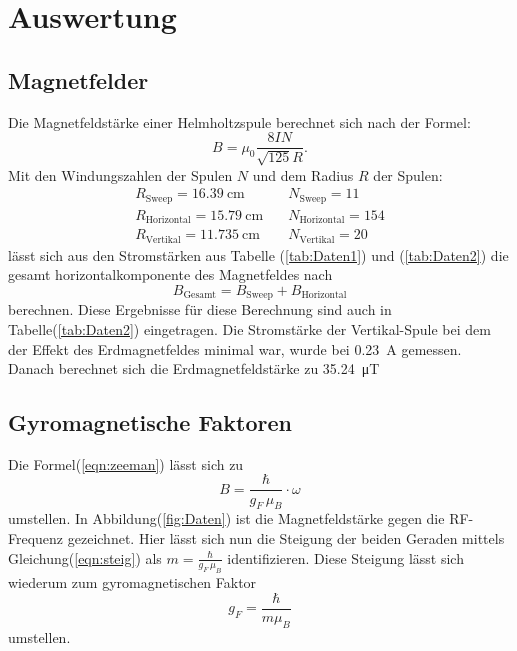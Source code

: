\section{Auswertung}
	

	\subsection{Magnetfelder}
		
		\noindent
		Die Magnetfeldstärke einer Helmholtzspule berechnet sich nach der Formel:
		\begin{equation}
			B = \mu_0 \frac{8IN}{\sqrt{125}R}.
		\end{equation}		
		Mit den Windungszahlen der Spulen $N$ und dem Radius $R$ der Spulen:
		\begin{align*}
			R_\text{Sweep} = \SI{16.39}{\centi\metre}			\quad   &N_\text{Sweep}    = 11		\\
			R_\text{Horizontal} = \SI{15.79}{\centi\metre}		\quad 	&N_\text{Horizontal} = 154  \\
			R_\text{Vertikal} = \SI{11.735}{\centi\metre}		\quad	&N_\text{Vertikal} = 20
		\end{align*}
		lässt sich aus den Stromstärken aus Tabelle (\ref{tab:Daten1}) und (\ref{tab:Daten2}) die gesamt horizontalkomponente des Magnetfeldes nach
		\begin{equation*}
			B_\text{Gesamt} = B_\text{Sweep} + B_\text{Horizontal}
		\end{equation*} 
		berechnen. Diese Ergebnisse für diese Berechnung sind auch in Tabelle(\ref{tab:Daten2}) eingetragen.
		Die Stromstärke der Vertikal-Spule bei dem der Effekt des Erdmagnetfeldes minimal war, wurde bei \SI{0.23}{\ampere}  gemessen.
		Danach berechnet sich die Erdmagnetfeldstärke zu \SI{35.24}{\micro\tesla}
		
	\subsection{Gyromagnetische Faktoren}
		
		\noindent
		Die Formel(\ref{eqn:zeeman}) lässt sich zu 
		\begin{equation*}
			B = \frac{\hbar}{g_F \, \mu_B} \cdot \omega
			\label{eqn:steig}
		\end{equation*}
		umstellen. In Abbildung(\ref{fig:Daten}) ist die Magnetfeldstärke gegen die RF-Frequenz gezeichnet.
		Hier lässt sich nun die Steigung der beiden Geraden mittels Gleichung(\ref{eqn:steig}) als $ m = \frac{\hbar}{g_F \, \mu_B}$ identifizieren.		
		Diese Steigung lässt sich wiederum zum gyromagnetischen Faktor
		\begin{equation}
		 	g_F = \frac{\hbar}{m \mu_B}
			\label{eqn:gyro}
		\end{equation}
		umstellen.		

